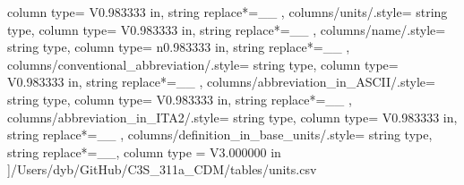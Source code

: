 \begin{landscape}
{            column type= V{0.983333 in}, 
            string replace*={_}{\_}
        },
    columns/units/.style={
            string type, 
            column type= V{0.983333 in}, 
            string replace*={_}{\_}
        },
    columns/name/.style={
            string type, 
            column type= n{0.983333 in}, 
            string replace*={_}{\_}
        },
    columns/conventional_abbreviation/.style={
            string type, 
            column type= V{0.983333 in}, 
            string replace*={_}{\_}
        },
    columns/abbreviation_in_ASCII/.style={
            string type, 
            column type= V{0.983333 in}, 
            string replace*={_}{\_}
        },
    columns/abbreviation_in_ITA2/.style={
            string type, 
            column type= V{0.983333 in}, 
            string replace*={_}{\_}
        },
    columns/definition_in_base_units/.style={
            string type, 
            string replace*={_}{\_},
            column type = V{3.000000 in}
        }
    ]{/Users/dyb/GitHub/C3S_311a_CDM/tables/units.csv}
\end{landscape}
